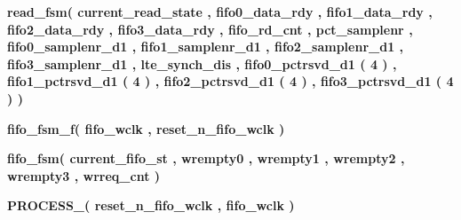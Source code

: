 \begin{DoxyCompactItemize}
{\bf read\+\_\+fsm}{\bfseries  ( {\bfseries {\bfseries {\bf current\+\_\+read\+\_\+state}} \textcolor{vhdlchar}{ }} , {\bfseries {\bfseries {\bf fifo0\+\_\+data\+\_\+rdy}} \textcolor{vhdlchar}{ }} , {\bfseries {\bfseries {\bf fifo1\+\_\+data\+\_\+rdy}} \textcolor{vhdlchar}{ }} , {\bfseries {\bfseries {\bf fifo2\+\_\+data\+\_\+rdy}} \textcolor{vhdlchar}{ }} , {\bfseries {\bfseries {\bf fifo3\+\_\+data\+\_\+rdy}} \textcolor{vhdlchar}{ }} , {\bfseries {\bfseries {\bf fifo\+\_\+rd\+\_\+cnt}} \textcolor{vhdlchar}{ }} , {\bfseries {\bfseries {\bf pct\+\_\+samplenr}} \textcolor{vhdlchar}{ }} , {\bfseries {\bfseries {\bf fifo0\+\_\+samplenr\+\_\+d1}} \textcolor{vhdlchar}{ }} , {\bfseries {\bfseries {\bf fifo1\+\_\+samplenr\+\_\+d1}} \textcolor{vhdlchar}{ }} , {\bfseries {\bfseries {\bf fifo2\+\_\+samplenr\+\_\+d1}} \textcolor{vhdlchar}{ }} , {\bfseries {\bfseries {\bf fifo3\+\_\+samplenr\+\_\+d1}} \textcolor{vhdlchar}{ }} , {\bfseries {\bfseries {\bf lte\+\_\+synch\+\_\+dis}} \textcolor{vhdlchar}{ }} , {\bfseries {\bfseries {\bf fifo0\+\_\+pctrsvd\+\_\+d1}} \textcolor{vhdlchar}{(}\textcolor{vhdlchar}{ } \textcolor{vhdldigit}{4} \textcolor{vhdlchar}{)}\textcolor{vhdlchar}{ }} , {\bfseries {\bfseries {\bf fifo1\+\_\+pctrsvd\+\_\+d1}} \textcolor{vhdlchar}{(}\textcolor{vhdlchar}{ } \textcolor{vhdldigit}{4} \textcolor{vhdlchar}{)}\textcolor{vhdlchar}{ }} , {\bfseries {\bfseries {\bf fifo2\+\_\+pctrsvd\+\_\+d1}} \textcolor{vhdlchar}{(}\textcolor{vhdlchar}{ } \textcolor{vhdldigit}{4} \textcolor{vhdlchar}{)}\textcolor{vhdlchar}{ }} , {\bfseries {\bfseries {\bf fifo3\+\_\+pctrsvd\+\_\+d1}} \textcolor{vhdlchar}{(}\textcolor{vhdlchar}{ } \textcolor{vhdldigit}{4} \textcolor{vhdlchar}{)}\textcolor{vhdlchar}{ }} )}
\item 
{\bf fifo\+\_\+fsm\+\_\+f}{\bfseries  ( {\bfseries {\bfseries {\bf fifo\+\_\+wclk}} \textcolor{vhdlchar}{ }} , {\bfseries {\bfseries {\bf reset\+\_\+n\+\_\+fifo\+\_\+wclk}} \textcolor{vhdlchar}{ }} )}
\item 
{\bf fifo\+\_\+fsm}{\bfseries  ( {\bfseries {\bfseries {\bf current\+\_\+fifo\+\_\+st}} \textcolor{vhdlchar}{ }} , {\bfseries {\bfseries {\bf wrempty0}} \textcolor{vhdlchar}{ }} , {\bfseries {\bfseries {\bf wrempty1}} \textcolor{vhdlchar}{ }} , {\bfseries {\bfseries {\bf wrempty2}} \textcolor{vhdlchar}{ }} , {\bfseries {\bfseries {\bf wrempty3}} \textcolor{vhdlchar}{ }} , {\bfseries {\bfseries {\bf wrreq\+\_\+cnt}} \textcolor{vhdlchar}{ }} )}
\item 
{\bf P\+R\+O\+C\+E\+S\+S\+\_}{\bfseries  ( {\bfseries {\bfseries {\bf reset\+\_\+n\+\_\+fifo\+\_\+wclk}} \textcolor{vhdlchar}{ }} , {\bfseries {\bfseries {\bf fifo\+\_\+wclk}} \textcolor{vhdlchar}{ }} )}

\end{DoxyCompactItemize}
